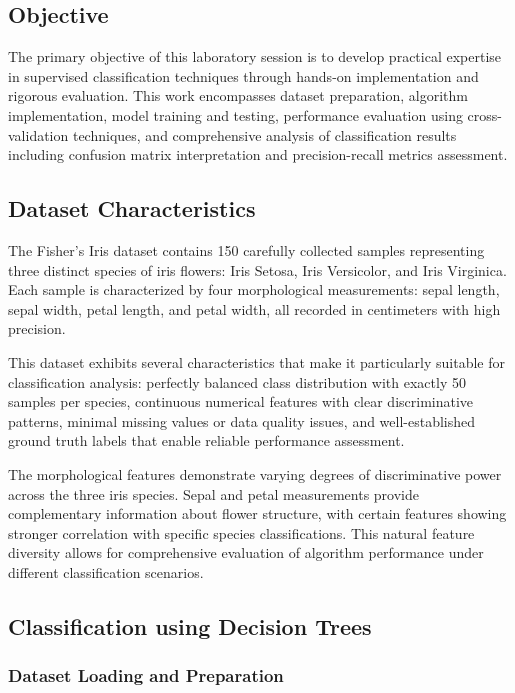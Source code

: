 \documentclass[12pt,a4paper]{article}
\begin{document}
\subsection{Objective}
The primary objective of this laboratory session is to develop practical expertise in supervised classification techniques through hands-on implementation and rigorous evaluation. This work encompasses dataset preparation, algorithm implementation, model training and testing, performance evaluation using cross-validation techniques, and comprehensive analysis of classification results including confusion matrix interpretation and precision-recall metrics assessment.
\subsection{Dataset Characteristics}

The Fisher's Iris dataset contains 150 carefully collected samples representing three distinct species of iris flowers: Iris Setosa, Iris Versicolor, and Iris Virginica. Each sample is characterized by four morphological measurements: sepal length, sepal width, petal length, and petal width, all recorded in centimeters with high precision.

This dataset exhibits several characteristics that make it particularly suitable for classification analysis: perfectly balanced class distribution with exactly 50 samples per species, continuous numerical features with clear discriminative patterns, minimal missing values or data quality issues, and well-established ground truth labels that enable reliable performance assessment.

The morphological features demonstrate varying degrees of discriminative power across the three iris species. Sepal and petal measurements provide complementary information about flower structure, with certain features showing stronger correlation with specific species classifications. This natural feature diversity allows for comprehensive evaluation of algorithm performance under different classification scenarios.

\subsection{Classification using Decision Trees}

\subsubsection{Dataset Loading and Preparation}
\end{document}
